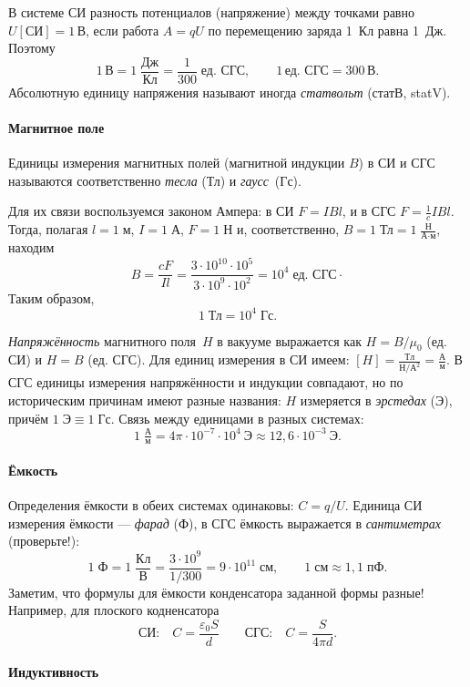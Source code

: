 В системе СИ разность потенциалов (напряжение)
между точками равно $U[\text{СИ}]=1\,\text{В}$,
если работа $A=qU$ по перемещению заряда 1~Кл равна 1~Дж. Поэтому
\[
1\,\text{В}=1\;\frac{\text{Дж}}{\text{Кл}}=\frac{1}{300}\;\text{ед. СГС},\qquad1\,\text{ед. СГС}=300\,\text{В}.
\]
Абсолютную единицу напряжения называют иногда \emph{статвольт} (статВ, statV).


\paragraph{Магнитное поле}

Единицы измерения магнитных полей (магнитной индукции $B$) в СИ и СГС называются соответственно
\emph{тесла} (Тл) и \emph{гаусс}~(Гс).

Для их связи воспользуемся
законом Ампера: в СИ $F=IBl$, и в СГС $F=\frac{1}{c}IBl$. Тогда,
полагая $l=1\;\text{м}$, $I=1\;\text{А}$, $F=1\;\text{Н}$ и, соответственно,
$B=1\;\text{Тл}=1\;\frac{\text{Н}}{\text{А}\cdot\text{м}}$, находим
\[
B=\frac{cF}{Il}=\frac{3\cdot10^{10}\cdot10^{5}}{3\cdot10^{9}\cdot10^{2}}=10^{4}\;\text{ед. СГС}\cdot
\]
Таким образом,
\[
1\;\text{Тл}=10^{4}\;\text{Гс}.
\]

\emph{Напряжённость} магнитного поля~$H$ в вакууме выражается как $H=B/\mu_0$ 
(ед. СИ) и $H=B$ (ед. СГС). Для единиц измерения в СИ имеем: 
$[H] = \frac{Тл}{Н/А^2}=\frac{А}{м}$. В СГС единицы измерения напряжённости
и индукции совпадают, но по историческим причинам имеют разные названия:
$H$ измеряется в \emph{эрстедах} (Э), причём $1\;\text{Э} \equiv 1\;\text{Гс}$.
Связь между единицами в разных системах:
\[
1\;\tfrac{А}{м} = 4\pi \cdot 10^{-7}\cdot 10^4~Э \approx 12,6\cdot 10^{-3}~Э.
\]


\paragraph{Ёмкость}

Определения ёмкости в обеих системах одинаковы: $C=q/U$. Единица СИ измерения ёмкости --- \emph{фарад} (Ф), в
СГС ёмкость выражается в \emph{сантиметрах} (проверьте!):
\[
1\;\text{Ф}=1\;\frac{\text{Кл}}{\text{В}}=\frac{3\cdot10^{9}}{1/300}=9\cdot10^{11}\;\text{см},\qquad1\;\text{см}\approx1{,}1\;\text{пФ}.
\]
Заметим, что формулы для ёмкости конденсатора заданной формы разные! 
Например, для плоского кодненсатора
    \[
\text{СИ:}\quad   C=\frac{\varepsilon_{0}S}{d}\qquad
\text{СГС:}\quad C=\frac{S}{4\pi d}.
    \]


\paragraph{Индуктивность}

